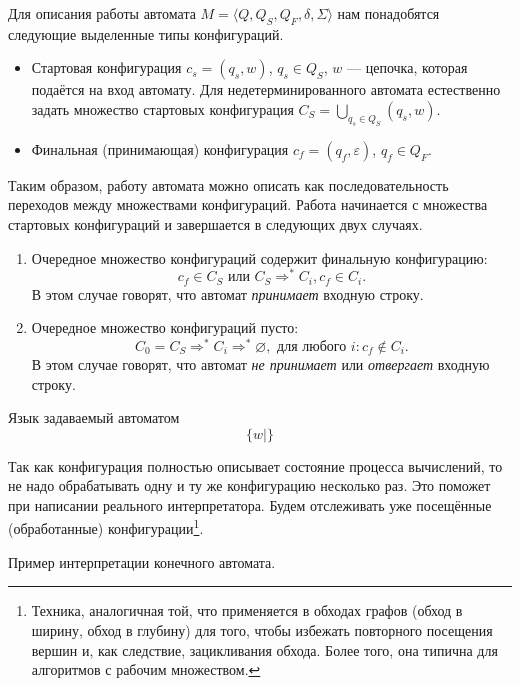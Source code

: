 Для описания работы автомата $M = \langle Q, Q_S, Q_F, \delta, \Sigma \rangle$ нам понадобятся следующие выделенные типы конфигураций.
\begin{itemize}
    \item Стартовая конфигурация $c_s = (q_s,w)$, $q_s \in Q_S$, $w$ --- цепочка, которая подаётся на вход автомату. 
    Для недетерминированного автомата естественно задать множество стартовых конфигурация $C_S = \bigcup_{q_s \in Q_S} (q_s,w)$.
    \item Финальная (принимающая) конфигурация $c_f = (q_f,\varepsilon)$, $q_f \in Q_F$.
\end{itemize}

Таким образом, работу автомата можно описать как последовательность переходов между множествами конфигураций. 
Работа начинается с множества стартовых конфигураций и завершается в следующих двух случаях.
\begin{enumerate}
    \item Очередное множество конфигураций содержит финальную конфигурацию:
    $$c_f \in C_S \text{ или } C_S \Rightarrow^* C_i, c_f \in C_i.$$ В этом случае говорят, что автомат \textit{принимает} входную строку.
    \item Очередное множество конфигураций пусто:
    $$C_0 = C_S \Rightarrow^* C_i \Rightarrow^* \varnothing, \text{ для любого } i: c_f \notin C_i.$$ 
    В этом случае говорят, что автомат \textit{не принимает} или \textit{отвергает} входную строку.
\end{enumerate} 

\begin{definition}
    Язык задаваемый автоматом $$\{w \mid \}$$
\end{definition}

Так как конфигурация полностью описывает состояние процесса вычислений, то не надо обрабатывать одну и ту же конфигурацию несколько раз. 
Это поможет при написании реального интерпретатора. 
Будем отслеживать уже посещённые (обработанные) конфигурации\footnote{Техника, аналогичная той, что применяется в обходах графов (обход в ширину, обход в глубину) для того, чтобы избежать повторного посещения вершин и, как следствие, зацикливания обхода. Более того, она типична для алгоритмов с рабочим множеством.}. 

\begin{example}
    Пример интерпретации конечного автомата.
\end{example}

